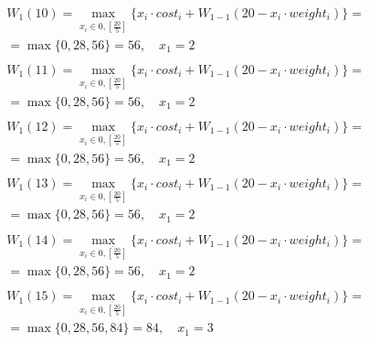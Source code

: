 \documentclass[17pt]{extarticle}
\begin{document}
\[
    \begin{aligned}
         & W_1(10)=\max_{x_i \in \overline{0, \left[\frac{20}{5}\right]}} \{x_i \cdot cost_i + W_{1-1}(20 - x_i \cdot weight_i)\}= \\& = \max \{
        0, 28, 56\}= 56, \quad x_1 = 2                                                                                             \\
    \end{aligned}
\]
\[
    \begin{aligned}
         & W_1(11)=\max_{x_i \in \overline{0, \left[\frac{20}{5}\right]}} \{x_i \cdot cost_i + W_{1-1}(20 - x_i \cdot weight_i)\}= \\& = \max \{
        0, 28, 56\}= 56, \quad x_1 = 2                                                                                             \\
    \end{aligned}
\]
\[
    \begin{aligned}
         & W_1(12)=\max_{x_i \in \overline{0, \left[\frac{20}{5}\right]}} \{x_i \cdot cost_i + W_{1-1}(20 - x_i \cdot weight_i)\}= \\& = \max \{
        0, 28, 56\}= 56, \quad x_1 = 2                                                                                             \\
    \end{aligned}
\]
\[
    \begin{aligned}
         & W_1(13)=\max_{x_i \in \overline{0, \left[\frac{20}{5}\right]}} \{x_i \cdot cost_i + W_{1-1}(20 - x_i \cdot weight_i)\}= \\& = \max \{
        0, 28, 56\}= 56, \quad x_1 = 2                                                                                             \\
    \end{aligned}
\]
\[
    \begin{aligned}
         & W_1(14)=\max_{x_i \in \overline{0, \left[\frac{20}{5}\right]}} \{x_i \cdot cost_i + W_{1-1}(20 - x_i \cdot weight_i)\}= \\& = \max \{
        0, 28, 56\}= 56, \quad x_1 = 2                                                                                             \\
    \end{aligned}
\]
\[
    \begin{aligned}
         & W_1(15)=\max_{x_i \in \overline{0, \left[\frac{20}{5}\right]}} \{x_i \cdot cost_i + W_{1-1}(20 - x_i \cdot weight_i)\}= \\& = \max \{
        0, 28, 56, 84\}= 84, \quad x_1 = 3                                                                                         \\
    \end{aligned}
\]
\end{document}
